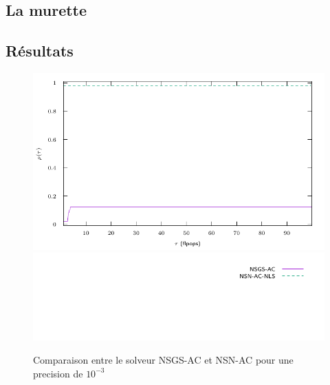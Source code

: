 \documentclass{CSMA2017}
\begin{document}
\subsection{La murette}
\subsection{Résultats}
\begin{figure}
  \centering
  \includegraphics{figure/LowWall_FEM.1e-3/simple/profile-LMGC_LowWall_FEM.pdf}
  \includegraphics{figure/LowWall_FEM.1e-3/simple/profile-LMGC_LowWall_FEM_legend.pdf}
  \caption{Comparaison entre le solveur NSGS-AC et NSN-AC pour une precision de $10^{-3}$}
  \label{fig:LowWall_FEM.1e-3.simple}
\end{figure}
\end{document}
